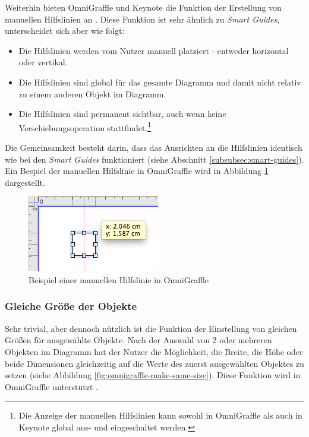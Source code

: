 Weiterhin bieten OmniGraffle und Keynote die Funktion der Erstellung von manuellen Hilfslinien an \cite{08OmniGraffle, 11Keynote}. Diese Funktion ist sehr ähnlich zu \textit{Smart Guides}, unterscheidet sich aber wie folgt:

\begin{itemize}
    \item Die Hilfslinien werden vom Nutzer manuell platziert - entweder horizontal oder vertikal.
    \item Die Hilfslinien sind global für das gesamte Diagramm und damit nicht relativ zu einem anderen Objekt im Diagramm.
    \item Die Hilfslinien sind permanent sichtbar, auch wenn keine Verschiebungsoperation stattfindet.\footnote{Die Anzeige der manuellen Hilfslinien kann sowohl in OmniGraffle als auch in Keynote global aus- und eingeschaltet werden.}
\end{itemize}

Die Gemeinsamkeit besteht darin, dass das Ausrichten an die Hilfslinien identisch wie bei den \textit{Smart Guides} funktioniert (siehe Abschnitt \ref{subsubsec:smart-guides}). Ein Bespiel der manuellen Hilfslinie in OmniGraffle wird in Abbildung \ref{fig:omnigraffle-manual-guides} dargestellt.

\begin{figure}[hbt]
    \centering
    \includegraphics{resources/omnigraffle-manual-guides.png}
    \caption{Beispiel einer manuellen Hilfslinie in OmniGraffle}
    \label{fig:omnigraffle-manual-guides}
\end{figure}

\subsubsection{Gleiche Größe der Objekte}

Sehr trivial, aber dennoch nützlich ist die Funktion der Einstellung von gleichen Größen für ausgewählte Objekte. Nach der Auswahl von 2 oder mehreren Objekten im Diagramm hat der Nutzer die Möglichkeit, die Breite, die Höhe oder beide Dimensionen gleichzeitig auf die Werte des zuerst ausgewählten Objektes zu setzen (siehe Abbildung \ref{fig:omnigraffle-make-same-size}). Diese Funktion wird in OmniGraffle unterstützt \cite{Olsen10OmniGraffle}.

